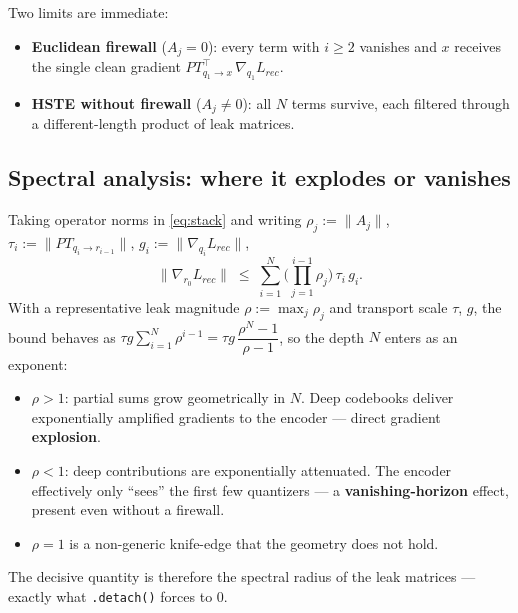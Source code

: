 \documentclass{article}
\begin{document}
Two limits are immediate:
\begin{itemize}
    \item \textbf{Euclidean firewall} ($A_j = 0$): every term with $i \ge 2$ vanishes and $x$ receives the single clean gradient $PT_{q_1\to x}^{\top}\,\nabla_{q_1} L_{rec}$.
    \item \textbf{HSTE without firewall} ($A_j \neq 0$): all $N$ terms survive, each filtered through a different-length product of leak matrices.
\end{itemize}

\subsection*{Spectral analysis: where it explodes or vanishes}
Taking operator norms in \eqref{eq:stack} and writing $\rho_j := \|A_j\|$, $\tau_i := \|PT_{q_i\to r_{i-1}}\|$, $g_i := \|\nabla_{q_i} L_{rec}\|$,
\begin{equation}
    \|\nabla_{r_0} L_{rec}\| \;\le\; \sum_{i=1}^{N} \Big(\textstyle\prod_{j=1}^{i-1}\rho_j\Big)\, \tau_i\, g_i .
\end{equation}
With a representative leak magnitude $\rho := \max_j \rho_j$ and transport scale $\tau$, $g$, the bound behaves as $\tau g \sum_{i=1}^{N} \rho^{i-1} = \tau g\,\dfrac{\rho^{N}-1}{\rho-1}$, so the depth $N$ enters as an exponent:
\begin{itemize}
    \item $\rho > 1$: partial sums grow geometrically in $N$. Deep codebooks deliver exponentially amplified gradients to the encoder --- direct gradient \textbf{explosion}.
    \item $\rho < 1$: deep contributions are exponentially attenuated. The encoder effectively only ``sees'' the first few quantizers --- a \textbf{vanishing-horizon} effect, present even without a firewall.
    \item $\rho = 1$ is a non-generic knife-edge that the geometry does not hold.
\end{itemize}
The decisive quantity is therefore the spectral radius of the leak matrices --- exactly what \texttt{.detach()} forces to $0$.
\end{document}
